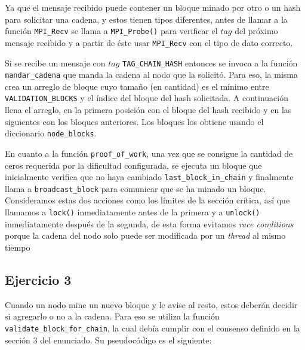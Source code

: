 \documentclass[10pt, a4paper, hidelinks]{article}
\begin{document}
Ya que el mensaje recibido puede contener un bloque minado por otro o un hash para solicitar una cadena, y estos tienen tipos diferentes, antes de llamar a la función \texttt{MPI\_Recv} se llama a \texttt{MPI\_Probe()} para verificar el $tag$ del próximo mensaje recibido y a partir de éste usar \texttt{MPI\_Recv} con el tipo de dato correcto.

Si se recibe un mensaje con $tag$ \texttt{TAG\_CHAIN\_HASH} entonces se invoca a la función \texttt{mandar\_cadena} que manda la cadena al nodo que la solicitó. Para eso, la misma crea un arreglo de bloque cuyo tamaño (en cantidad) es el mínimo entre \texttt{VALIDATION\_BLOCKS} y el índice del bloque del hash solicitada. A continuación llena el arreglo, en la primera posición con el bloque del hash recibido y en las siguientes con los bloques anteriores. Los bloques los obtiene usando el diccionario \texttt{node\_blocks}.

En cuanto a la función \texttt{proof\_of\_work}, una vez que se consigue la cantidad de ceros requerida por la dificultad configurada, se ejecuta un bloque que inicialmente verifica que no haya cambiado \texttt{last\_block\_in\_chain} y finalmente llama a \texttt{broadcast\_block} para comunicar que se ha minado un bloque. Consideramos estas dos acciones como los límites de la sección crítica, así que llamamos a \texttt{lock()} inmediatamente antes de la primera y a \texttt{unlock()} inmediatamente después de la segunda, de esta forma evitamos \textit{race conditions} porque la cadena del nodo solo puede ser modificada por un \textit{thread} al mismo tiempo

\subsection{Ejercicio 3}
Cuando un nodo mine un nuevo bloque y le avise al resto, estos deberán decidir si agregarlo o no a la cadena. Para eso se utiliza la función \texttt{validate\_block\_for\_chain}, la cual debía cumplir con el consenso definido en la sección 3 del enunciado. Su pseudocódigo es el siguiente:
\end{document}
